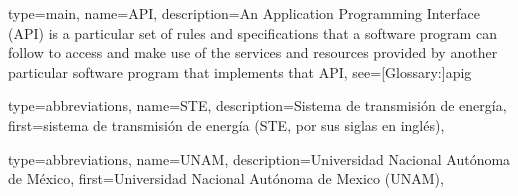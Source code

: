 



{   type=main,
    name={API},
    description={An Application Programming Interface (API) is a particular set
of rules and specifications that a software program can follow to access and
make use of the services and resources provided by another particular software
program that implements that API},
    see=[Glossary:]{apig}
}



{   type=abbreviations,
    name={STE},
    description={Sistema de transmisión de energía},
    first={sistema de transmisión de energía (STE, por sus siglas en inglés)},
}


{   type=abbreviations,
    name={UNAM},
    description={Universidad Nacional Autónoma de México},
    first={Universidad Nacional Autónoma de Mexico (UNAM)},
}

